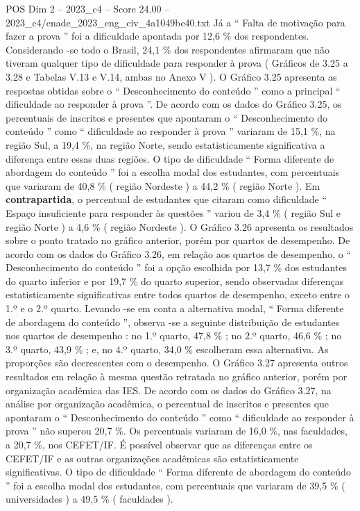 \begin{textsample}{POS Dim 2 – 2023\_c4 – Score 24.00 – 2023\_c4/enade\_2023\_eng\_civ\_4a1049be40.txt}
Já a “ Falta de motivação para fazer a prova ” foi a dificuldade apontada por 12,6 \% dos respondentes.
Considerando -se todo o Brasil, 24,1 \% dos respondentes afirmaram que não tiveram qualquer tipo de dificuldade para responder à prova ( Gráficos de 3.25 a 3.28 e Tabelas V.13 e V.14, ambas no Anexo V ).
O Gráfico 3.25 apresenta as respostas obtidas sobre o “ Desconhecimento do conteúdo ” como a principal “ dificuldade ao responder à prova ”.
De acordo com os dados do Gráfico 3.25, os percentuais de inscritos e presentes que apontaram o “ Desconhecimento do conteúdo ” como “ dificuldade ao responder à prova ” variaram de 15,1 \%, na região Sul, a 19,4 \%, na região Norte, sendo estatisticamente significativa a diferença entre essas duas regiões.
O tipo de dificuldade “ Forma diferente de abordagem do conteúdo ” foi a escolha modal dos estudantes, com percentuais que variaram de 40,8 \% ( região Nordeste ) a 44,2 \% ( região Norte ).
Em \textbf{contrapartida}, o percentual de estudantes que citaram como dificuldade “ Espaço insuficiente para responder às questões ” variou de 3,4 \% ( região Sul e região Norte ) a 4,6 \% ( região Nordeste ).
O Gráfico 3.26 apresenta os resultados sobre o ponto tratado no gráfico anterior, porém por quartos de desempenho.
De acordo com os dados do Gráfico 3.26, em relação aos quartos de desempenho, o “ Desconhecimento do conteúdo ” foi a opção escolhida por 13,7 \% dos estudantes do quarto inferior e por 19,7 \% do quarto superior, sendo observadas diferenças estatisticamente significativas entre todos quartos de desempenho, exceto entre o 1.º e o 2.º quarto.
Levando -se em conta a alternativa modal, “ Forma diferente de abordagem do conteúdo ”, observa -se a seguinte distribuição de estudantes nos quartos de desempenho : no 1.º quarto, 47,8 \% ; no 2.º quarto, 46,6 \% ; no 3.º quarto, 43,9 \% ; e, no 4.º quarto, 34,0 \% escolheram essa alternativa.
As proporções são decrescentes com o desempenho.
O Gráfico 3.27 apresenta outros resultados em relação à mesma questão retratada no gráfico anterior, porém por organização acadêmica das IES.
De acordo com os dados do Gráfico 3.27, na análise por organização acadêmica, o percentual de inscritos e presentes que apontaram o “ Desconhecimento do conteúdo ” como “ dificuldade ao responder à prova ” não superou 20,7 \%.
Os percentuais variaram de 16,0 \%, nas faculdades, a 20,7 \%, nos CEFET/IF.
É possível observar que as diferenças entre os CEFET/IF e as outras organizações acadêmicas são estatisticamente significativas.
O tipo de dificuldade “ Forma diferente de abordagem do conteúdo ” foi a escolha modal dos estudantes, com percentuais que variaram de 39,5 \% ( universidades ) a 49,5 \% ( faculdades ).

\end{textsample}
